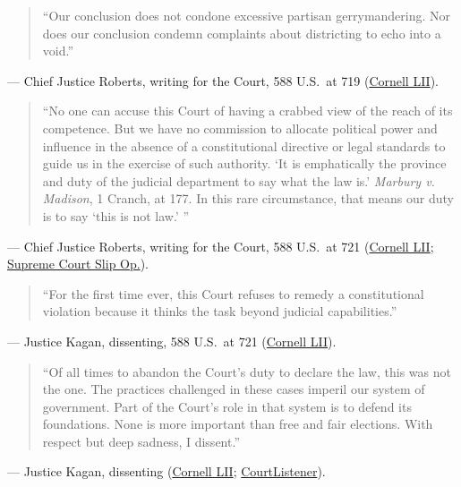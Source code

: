 \documentclass[12pt]{article}
\begin{document}
\begin{quote}
``Our conclusion does not condone excessive partisan gerrymandering. Nor does our conclusion condemn complaints about districting to echo into a void.''
\end{quote}
\noindent --- Chief Justice Roberts, writing for the Court, 588 U.S.\ at 719 (\href{https://www.law.cornell.edu/supremecourt/text/18-422}{Cornell LII}).

\begin{quote}
``No one can accuse this Court of having a crabbed view of the reach of its competence. But we have no commission to allocate political power and influence in the absence of a constitutional directive or legal standards to guide us in the exercise of such authority. `It is emphatically the province and duty of the judicial department to say what the law is.' \textit{Marbury v. Madison}, 1 Cranch, at 177. In this rare circumstance, that means our duty is to say `this is not law.' ''
\end{quote}
\noindent --- Chief Justice Roberts, writing for the Court, 588 U.S.\ at 721 (\href{https://www.law.cornell.edu/supremecourt/text/18-422}{Cornell LII}; \href{https://www.supremecourt.gov/opinions/18pdf/18-422_9ol1.pdf}{Supreme Court Slip Op.}).

\begin{quote}
``For the first time ever, this Court refuses to remedy a constitutional violation because it thinks the task beyond judicial capabilities.''
\end{quote}
\noindent --- Justice Kagan, dissenting, 588 U.S.\ at 721 (\href{https://www.law.cornell.edu/supremecourt/text/18-422}{Cornell LII}).

\begin{quote}
``Of all times to abandon the Court's duty to declare the law, this was not the one. The practices challenged in these cases imperil our system of government. Part of the Court's role in that system is to defend its foundations. None is more important than free and fair elections. With respect but deep sadness, I dissent.''
\end{quote}
\noindent --- Justice Kagan, dissenting (\href{https://www.law.cornell.edu/supremecourt/text/18-422}{Cornell LII}; \href{https://www.courtlistener.com/opinion/4633469/rucho-v-common-cause/}{CourtListener}).
\end{document}
